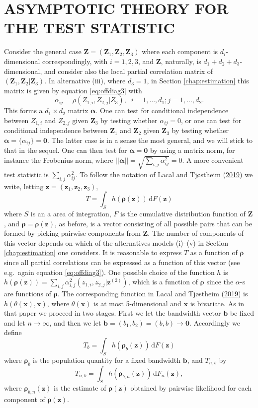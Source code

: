 \documentclass[
  12pt,
  letterpaper]{article}
\numberwithin{equation}{section}
\newcommand{\x}{\bm{x}}
\newcommand{\Z}{\bm{Z}}
\newcommand{\z}{\bm{z}}
\newcommand{\ztwo}{\bm{z}^{(2)}}
\newcommand{\frho}{\bm{\rho}}
\newcommand{\bb}{\bm{b}}
\newcommand{\falpha}{\bm{\alpha}}
\newcommand{\di}{\,\textrm{d}}
\begin{document}
\hypertarget{asymptotic-theory-for-the-test-statistic}{%
\section{ASYMPTOTIC THEORY FOR THE TEST STATISTIC}\label{asymptotic-theory-for-the-test-statistic}}

Consider the general case \(\Z = (\Z_1, \Z_2, \Z_3)\) where each component is \(d_i\)-dimensional correspondingly, with \(i = 1,2,3\), and \(\Z\), naturally, is \(d_1+d_2+d_3\)-dimensional, and consider also the local partial correlation matrix of \((\Z_1,\Z_2|\Z_3)\). In alternative (iii), where \(d_3 = 1\), in Section \ref{chap:estimation} this matrix is given by equation \eqref{eq:offdiag3} with
\[
\alpha_{ij} = \rho(Z_{1,i},Z_{2,j}|Z_3), \;\; i=1,\ldots,d_1; j = 1,\dots,d_2.
\]
This forms a \(d_1 \times d_2\) matrix \({\falpha}\). One can test for conditional independence between \(Z_{1,i}\) and \(Z_{2,j}\) given \(\Z_3\) by testing whether \(\alpha_{ij}=0\), or one can test for conditional independence between \(\Z_1\) and \(\Z_2\) given \(\Z_3\) by testing whether \({\falpha} = \{\alpha_{ij}\} = {\bm{0}}\). The latter case is in a sense the most general, and we will stick to that in the sequel. One can then test for \({\falpha} = {\bm{0}}\) by using a matrix norm, for instance the Frobenius norm, where \(||{\falpha}|| = \sqrt{\sum_{i,j} \alpha_{ij}^2} = 0\). A more convenient test statistic is \(\sum_{i,j} \alpha_{ij}^2\). To follow the notation of Lacal and Tjøstheim (\protect\hyperlink{ref-lacal2018estimating}{2019}) we write, letting \(\z=(\z_1,\z_2,\z_3)\),
\[
T = \int_S h(\frho(\z)) \di F(\z)
\]
where \(S\) is an a area of integration, \(F\) is the cumulative distribution function of \(\Z\), and \(\frho = \frho(\z)\), as before, is a vector consisting of all possible pairs that can be formed by picking pairwise components from \(\Z\). The number of components of this vector depends on which of the alternatives models (i)--(v) in Section \ref{chap:estimation} one considers. It is reasonable to express \(T\) as a function of \(\frho\) since all partial correlations can be expressed as a function of this vector (see e.g.~again equation \eqref{eq:offdiag3}). One possible choice of the function \(h\) is \(h(\frho(\z)) = \sum_{i,j} \alpha_{i,j}^2(z_{1,i},z_{2,j}|\ztwo)\), which is a function of \(\frho\) since the \(\alpha\)-s are functions of \(\frho\). The corresponding function in Lacal and Tjøstheim (\protect\hyperlink{ref-lacal2018estimating}{2019}) is \(h(\theta(\x), \x)\), where \(\theta(\x)\) is at most 5-dimensional and \(\x\) is bivariate. As in that paper we proceed in two stages. First we let the bandwidth vector \(\bb\) be fixed and let \(n \to \infty\), and then we let \(\bb = (b_1,b_2) = (b,b) \to \bm{0}\).
Accordingly we define
\[
T_b = \int_S h(\frho_b(\z)) \di F(\z) 
\]
where \(\frho_b\) is the population quantity for a fixed bandwidth \(\bb\), and \(T_{n,b}\) by
\[
T_{n,b} = \int_S h(\frho_{b,n}(\z)) \di F_n(\z),
\]
where \(\frho_{b,n}(\z)\) is the estimate of \(\frho(\z)\) obtained by pairwise likelihood for each component of \(\frho(\z)\).
\end{document}
